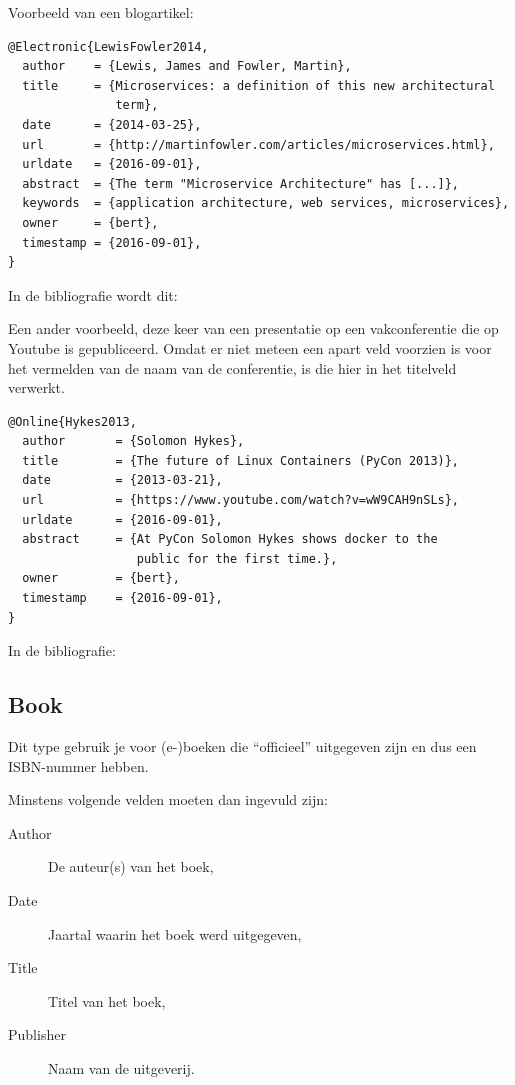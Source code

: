 
Voorbeeld van een blogartikel:

\begin{verbatim}
@Electronic{LewisFowler2014,
  author    = {Lewis, James and Fowler, Martin},
  title     = {Microservices: a definition of this new architectural
               term},
  date      = {2014-03-25},
  url       = {http://martinfowler.com/articles/microservices.html},
  urldate   = {2016-09-01},
  abstract  = {The term "Microservice Architecture" has [...]},
  keywords  = {application architecture, web services, microservices},
  owner     = {bert},
  timestamp = {2016-09-01},
}
\end{verbatim}

In de bibliografie wordt dit: 

Een ander voorbeeld, deze keer van een presentatie op een vakconferentie die op Youtube is gepubliceerd. Omdat er niet meteen een apart veld voorzien is voor het vermelden van de naam van de conferentie, is die hier in het titelveld verwerkt.

\begin{verbatim}
@Online{Hykes2013,
  author       = {Solomon Hykes},
  title        = {The future of Linux Containers (PyCon 2013)},
  date         = {2013-03-21},
  url          = {https://www.youtube.com/watch?v=wW9CAH9nSLs},
  urldate      = {2016-09-01},
  abstract     = {At PyCon Solomon Hykes shows docker to the
                  public for the first time.},
  owner        = {bert},
  timestamp    = {2016-09-01},
}
\end{verbatim}

In de bibliografie: 

\subsection{Book}%
\label{ssec:book}

Dit type gebruik je voor (e-)boeken die ``officieel'' uitgegeven zijn en dus een ISBN-nummer hebben.

Minstens volgende velden moeten dan ingevuld zijn:

\begin{description}
  \item[Author] De auteur(s) van het boek,
  \item[Date] Jaartal waarin het boek werd uitgegeven,
  \item[Title] Titel van het boek,
  \item[Publisher] Naam van de uitgeverij.
\end{description}

